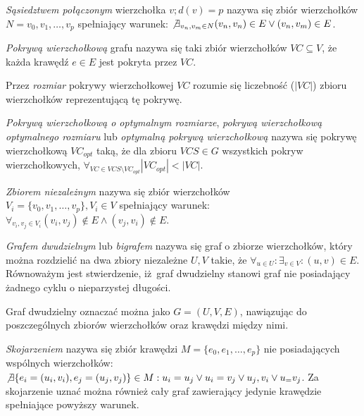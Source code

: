 \begin{definition}
  \emph{Sąsiedztwem połączonym} wierzchołka $v; d(v)=p$ nazywa się zbiór wierzchołków 
  $N={v_0, v_1, \ldots, v_p}$ spełniający warunek:
  $\not \exists_{v_n, v_m \in N}{(v_n,v_n) \in E \lor (v_n,v_m) \in E}$.
\end{definition}

\begin{definition}
  \emph{Pokrywą wierzchołkową} grafu nazywa się taki zbiór wierzchołków
  $VC \subseteq V$, że każda krawędź $e \in E$ jest pokryta przez $VC$.
\end{definition}

\begin{definition}
  Przez \emph{rozmiar} pokrywy wierzchołkowej $VC$ rozumie się liczebność ($|VC|$)
  zbioru wierzchołków reprezentującą tę pokrywę.
\end{definition}

\begin{definition}
  \emph{Pokrywą wierzchołkową o optymalnym rozmiarze}, \emph{pokrywą 
  wierzchołkową optymalnego rozmiaru} lub \emph{optymalną pokrywą wierzchołkową} 
  nazywa się pokrywę wierzchołkową $VC_{opt}$ taką, że dla zbioru $VCS \in G$ 
  wszystkich pokryw wierzchołkowych, 
  $\forall_{VC \in VCS \setminus VC_{opt}}{|VC_{opt}| < |VC|}$.
\end{definition}

\begin{definition}
  \emph{Zbiorem niezależnym} nazywa się zbiór wierzchołków\\
  $V_i=\{v_0, v_1, \ldots, v_p \}, V_i \in V$ spełniający warunek:
  $\forall_{v_i, v_j \in V_i}{(v_i, v_j) \notin E \land (v_j, v_i) \notin E}$.
\end{definition}

\begin{definition}
  \emph{Grafem dwudzielnym} lub \emph{bigrafem} nazywa się graf o zbiorze 
  wierzchołków, który można rozdzielić na dwa zbiory niezależne $U, V$ takie, że
  $\forall_{u \in U}: \exists_{v \in V}: (u,v) \in E$.
  Równoważym jest stwierdzenie, iż graf dwudzielny stanowi graf nie posiadający
  żadnego cyklu o nieparzystej długości.


  Graf dwudzielny oznaczać można jako $G=(U,V,E)$, nawiązując do poszczególnych
  zbiorów wierzchołków oraz krawędzi między nimi.
\end{definition}

\begin{definition}
  \emph{Skojarzeniem} nazywa się zbiór krawędzi $M=\{e_0, e_1, \ldots, e_p\}$
  nie posiadających wspólnych wierzchołków: ${\not\exists{\{e_i=(u_i,v_i),
  e_j=(u_j, v_j)\} \in M}: u_i=u_j \lor u_i=v_j \lor u_j,v_i \lor u_=v_j}$.
  Za skojarzenie uznać można również cały graf zawierający jedynie krawędzie
  spełniające powyższy warunek.
\end{definition}


